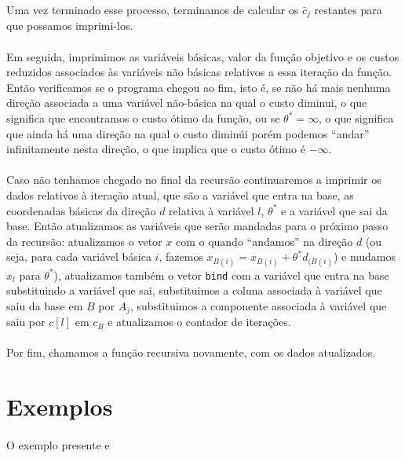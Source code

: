 \documentclass[a4paper]{article}
\begin{document}
Uma vez terminado esse processo, terminamos de calcular os $\bar{c}_{j}$ restantes para que possamos imprimi-los.\paragraph{}
Em seguida, imprimimos as variáveis básicas, valor da função objetivo e os custos reduzidos associados às variáveis não básicas relativos a essa iteração da função. Então verificamos se o programa chegou ao fim, isto é, se não há mais nenhuma direção associada a uma variável não-básica na qual o custo diminui, o que significa que encontramos o custo ótimo da função, ou se $\theta^* = \infty$, o que significa que ainda há uma direção na qual o custo diminúi porém podemos ``andar'' infinitamente nesta direção, o que implica que o custo ótimo é $-\infty$.\paragraph{}
Caso não tenhamos chegado no final da recursão continuaremos a imprimir os dados relativos à iteração atual, que são a variável que entra na base, as coordenadas básicas da direção $d$ relativa à variável $l$, $\theta^*$ e a variável que sai da base. Então atualizamos as variáveis que serão mandadas para o próximo passo da recursão: atualizamos o vetor $x$ com o quando ``andamos'' na direção $d$ (ou seja, para cada variável básica $i$, fazemos $x_{B(i)} = x_{B(i)} +\theta^*d_{(B(i)}$) e mudamos $x_{l}$ para $\theta^*$), atualizamos também o vetor \texttt{bind} com a variável que entra na base substituindo a variável que sai, substituimos a coluna associada à variável que saiu da base em $B$ por $A_{j}$, substituimos a componente associada à variável que saiu por $c[l]$ em $c_{B}$ e atualizamos o contador de iterações.\paragraph{}
Por fim, chamamos a função recursiva novamente, com os dados atualizados.

\section{Exemplos}

\paragraph{}
O exemplo presente e
\end{document}
